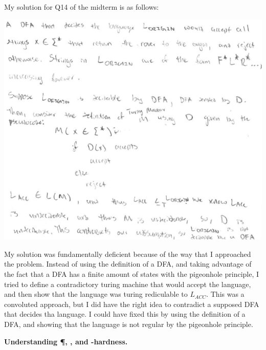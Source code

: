 \documentclass[11pt,addpoints,answers]{exam}
\begin{document}
\begin{questions}
  \begin{solution} 
  My solution for Q14 of the midterm is as follows:
  \begin{center}
    \includegraphics[width=0.8\linewidth]{q14midterm.png}
  \end{center}
  My solution was fundamentally deficient because of the way that I approached the problem. Instead of using the definition of a DFA, and taking advantage of the fact that a DFA has a finite amount of states with the pigeonhole principle, I tried to define a contradictory turing machine that would accept the language, and then show that the language was turing rediculable to $L_{ACC}$. This was a convoluted approach, but I did have the right idea to contradict a supposed DFA that decides tha language. I could have fixed this by using the definition of a DFA, and showing that the language is not regular by the pigeonhole principle.
  \end{solution}

\question \textbf{Understanding \P, \NP, and \NP-hardness.}
\end{questions}
\end{document}
